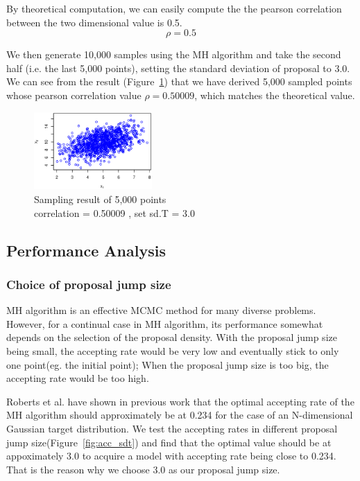 By theoretical computation, we can easily compute the the pearson correlation between the two dimensional value is 0.5.
$$ \rho = 0.5 $$

We then generate 10,000 samples using the MH algorithm and take the second half (i.e. the last 5,000 points), setting the standard deviation of proposal to 3.0. We can see from the result (Figure~\ref{fig:sample_result}) that we have derived 5,000 sampled points whose pearson correlation value $\rho=0.50009$, which matches the theoretical value.

\begin{figure}[tb]
\vspace{-0.5in}
  	\centering
  	\includegraphics[width=0.4\textwidth]{figure/sample_result.eps}
\vspace{-0.2in}
	\caption{Sampling result of 5,000 points \protect\\ correlation = 0.50009 , set sd.T = 3.0}
	\label{fig:sample_result}
\end{figure}




\subsection{Performance Analysis}

\subsubsection{Choice of proposal jump size}
MH algorithm is an effective MCMC method for many diverse problems. However, for a continual case in MH algorithm, its performance somewhat depends on the selection of the proposal density. With the proposal jump size being small, the accepting rate would be very low and eventually stick to only one point(eg. the initial point); When the proposal jump size is too big, the accepting rate would be too high. 

Roberts et al. have shown in previous work\cite{roberts1997weak} that the optimal accepting rate of the MH algorithm should approximately be at 0.234 for the case of an N-dimensional Gaussian target distribution. We test the accepting rates in different proposal jump size(Figure~\ref{fig:acc_sdt}) and find that the optimal value should be at appoximately 3.0 to acquire a model with accepting rate being close to 0.234. That is the reason why we choose 3.0 as our proposal jump size.

